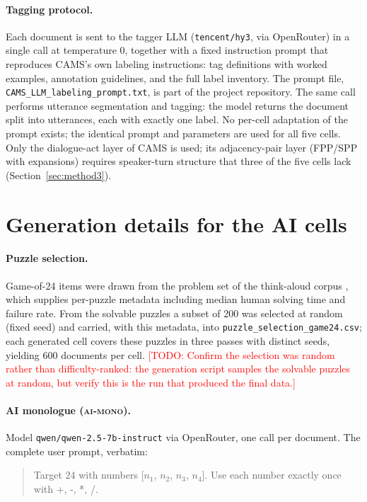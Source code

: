 \documentclass[11pt]{article}
\newcommand{\todo}[1]{\textcolor{red}{[TODO: #1]}}
\newcommand{\cellam}{\textsc{ai-mono}}
\begin{document}
\paragraph{Tagging protocol.} Each document is sent to the tagger LLM
(\texttt{tencent/hy3}, via OpenRouter) in a single call at temperature 0,
together with a fixed instruction prompt that reproduces CAMS's own labeling
instructions: tag definitions with worked examples, annotation guidelines,
and the full label inventory. The prompt file,
\texttt{CAMS\_LLM\_labeling\_prompt.txt}, is part of the project
repository. The same call
performs utterance segmentation and tagging: the model returns the document
split into utterances, each with exactly one label. No per-cell adaptation
of the prompt exists; the identical prompt and parameters are used for all
five cells. Only the dialogue-act layer of CAMS is used; its adjacency-pair
layer (FPP/SPP with expansions) requires speaker-turn structure that three
of the five cells lack (Section~\ref{sec:method3}).

\section{Generation details for the AI cells}
\label{app:generation}

\paragraph{Puzzle selection.} Game-of-24 items were drawn from the problem
set of the think-aloud corpus \citep{wurgaft2025thinkaloud}, which supplies
per-puzzle metadata including median human solving time and failure rate. From
the solvable puzzles a subset of 200 was selected at random (fixed seed) and
carried, with this metadata, into
\texttt{puzzle\_selection\_game24.csv}; each generated cell covers these
puzzles in three passes with distinct seeds, yielding 600 documents per cell.
\todo{Confirm the selection was random rather than difficulty-ranked: the
generation script samples the solvable puzzles at random, but verify this is
the run that produced the final data.}

\paragraph{AI monologue (\cellam{}).} Model
\texttt{qwen/qwen-2.5-7b-instruct} via OpenRouter, one call per document.
The complete user prompt, verbatim:

\begin{quote}\footnotesize\ttfamily
Target 24 with numbers [$n_1$, $n_2$, $n_3$, $n_4$]. Use each number exactly
once with +, -, *, /.
\end{quote}
\end{document}
